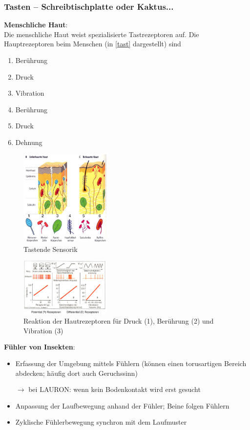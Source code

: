 \subsubsection{Tasten – Schreibtischplatte oder Kaktus...}
\textbf{Menschliche Haut}:\\
Die menschliche Haut weist spezialisierte Tastrezeptoren auf. Die Hauptrezeptoren beim Menschen (in \autoref{tast} dargestellt) sind
\begin{enumerate}
\setlength\itemsep{0em}
\item Berührung
\item Druck
\item Vibration
\item Berührung
\item Druck
\item Dehnung
\end{enumerate}
\begin{figure}[h!]
	\centering
	\includegraphics[width=0.4\textwidth]{figures/ch04_tast.png}
	\caption{Tastende Sensorik}
	\label{tast}
\end{figure}
\begin{figure}[h!]
	\centering
	\includegraphics[width=0.4\textwidth]{figures/ch04_tast1.png}
	\caption{Reaktion der Hautrezeptoren für Druck (1), Berührung (2) und Vibration (3)}
	\label{tast1}
\end{figure}
\textbf{Fühler von Insekten}:
\begin{itemize}
\item Erfassung der Umgebung mittels Fühlern (können einen torusartigen Bereich abdecken; häufig dort auch Geruchssinn)
\item[$\rightarrow$] bei LAURON: wenn kein Bodenkontakt wird erst gesucht
\item Anpassung der Laufbewegung anhand der Fühler; Beine folgen Fühlern
\item Zyklische Fühlerbewegung synchron mit dem Laufmuster
\end{itemize}
